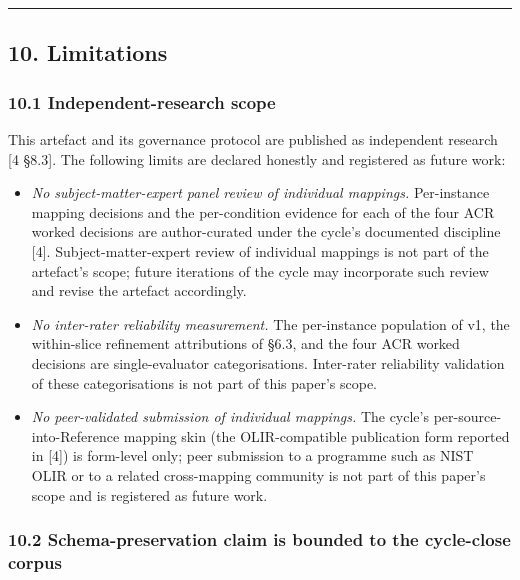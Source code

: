 \documentclass[
]{article}
\providecommand{\tightlist}{%
  \setlength{\itemsep}{0pt}\setlength{\parskip}{0pt}}
\begin{document}
\begin{center}\rule{0.5\linewidth}{0.5pt}\end{center}

\subsection{10. Limitations}\label{limitations}

\subsubsection{10.1 Independent-research
scope}\label{independent-research-scope}

This artefact and its governance protocol are published as independent
research {[}4 §8.3{]}. The following limits are declared honestly and
registered as future work:

\begin{itemize}
\tightlist
\item
  \emph{No subject-matter-expert panel review of individual mappings.}
  Per-instance mapping decisions and the per-condition evidence for each
  of the four ACR worked decisions are author-curated under the cycle's
  documented discipline {[}4{]}. Subject-matter-expert review of
  individual mappings is not part of the artefact's scope; future
  iterations of the cycle may incorporate such review and revise the
  artefact accordingly.
\item
  \emph{No inter-rater reliability measurement.} The per-instance
  population of v1, the within-slice refinement attributions of §6.3,
  and the four ACR worked decisions are single-evaluator
  categorisations. Inter-rater reliability validation of these
  categorisations is not part of this paper's scope.
\item
  \emph{No peer-validated submission of individual mappings.} The
  cycle's per-source-into-Reference mapping skin (the OLIR-compatible
  publication form reported in {[}4{]}) is form-level only; peer
  submission to a programme such as NIST OLIR or to a related
  cross-mapping community is not part of this paper's scope and is
  registered as future work.
\end{itemize}

\subsubsection{10.2 Schema-preservation claim is bounded to the
cycle-close
corpus}\label{schema-preservation-claim-is-bounded-to-the-cycle-close-corpus}
\end{document}
